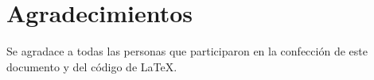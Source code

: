 \chapter*{Agradecimientos}
Se agradace a todas las personas que participaron en la confección de este documento y del código de \LaTeX{}.
